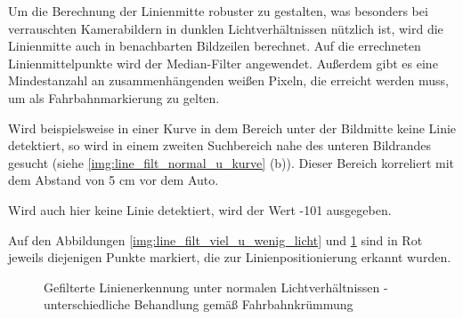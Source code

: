 \documentclass[12pt, a4paper]{scrartcl}
\begin{document}
Um die Berechnung der Linienmitte robuster zu gestalten, was besonders bei verrauschten Kamerabildern in dunklen Lichtverhältnissen nützlich ist, wird die Linienmitte auch in benachbarten Bildzeilen berechnet. Auf die errechneten Linienmittelpunkte wird der Median-Filter angewendet. Außerdem gibt es eine Mindestanzahl an zusammenhängenden weißen Pixeln, die erreicht werden muss, um als Fahrbahnmarkierung zu gelten.

Wird beispielsweise in einer Kurve in dem Bereich unter der Bildmitte keine Linie detektiert, so wird in einem zweiten Suchbereich nahe des unteren Bildrandes gesucht (siehe \autoref{img:line_filt_normal_u_kurve} (b)). Dieser Bereich korreliert mit dem Abstand von 5 cm vor dem Auto.

Wird auch hier keine Linie detektiert, wird der Wert -101 ausgegeben. 

Auf den Abbildungen \ref{img:line_filt_viel_u_wenig_licht} und \ref{img:line_filt_normal_u_kurve} sind in Rot jeweils diejenigen Punkte markiert, die zur Linienpositionierung erkannt wurden.


\begin{figure}
	\caption{Gefilterte Linienerkennung unter normalen Lichtverhältnissen - unterschiedliche Behandlung gemäß Fahrbahnkrümmung}
	\label{img:line_filt_normal_u_kurve}
\end{figure}
\end{document}
